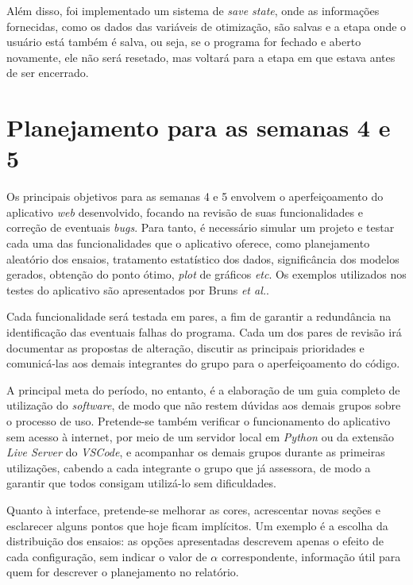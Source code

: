 \documentclass[12pt]{article}
\begin{document}
Além disso, foi implementado um sistema de \textit{save state}, onde as informações fornecidas, como os dados das variáveis de otimização, são salvas e a etapa onde o usuário está também é salva, ou seja, se o programa for fechado e aberto novamente, ele não será resetado, mas voltará para a etapa em que estava antes de ser encerrado.

\section{Planejamento para as semanas 4 e 5}

Os principais objetivos para as semanas 4 e 5 envolvem o aperfeiçoamento do aplicativo \textit{web} desenvolvido, focando na revisão de suas funcionalidades e correção de eventuais \textit{bugs}. Para tanto, é necessário simular um projeto e testar cada uma das funcionalidades que o aplicativo oferece, como planejamento aleatório dos ensaios, tratamento estatístico dos dados, significância dos modelos gerados, obtenção do ponto ótimo, \textit{plot} de gráficos \textit{etc}. Os exemplos utilizados nos testes do aplicativo são apresentados por Bruns \textit{et al.}\cite{barrosneto2001}.

Cada funcionalidade será testada em pares, a fim de garantir a redundância na identificação das eventuais falhas do programa. Cada um dos pares de revisão irá documentar as propostas de alteração, discutir as principais prioridades e comunicá-las aos demais integrantes do grupo para o aperfeiçoamento do código.

A principal meta do período, no entanto, é a elaboração de um guia completo de utilização do \textit{software}, de modo que não restem dúvidas aos demais grupos sobre o processo de uso. Pretende-se também verificar o funcionamento do aplicativo sem acesso à internet, por meio de um servidor local em \textit{Python} ou da extensão \textit{Live Server} do \textit{VSCode}, e acompanhar os demais grupos durante as primeiras utilizações, cabendo a cada integrante o grupo que já assessora, de modo a garantir que todos consigam utilizá-lo sem dificuldades.

Quanto à interface, pretende-se melhorar as cores, acrescentar novas seções e esclarecer alguns pontos que hoje ficam implícitos. Um exemplo é a escolha da distribuição dos ensaios: as opções apresentadas descrevem apenas o efeito de cada configuração, sem indicar o valor de $\alpha$ correspondente, informação útil para quem for descrever o planejamento no relatório.
\end{document}
